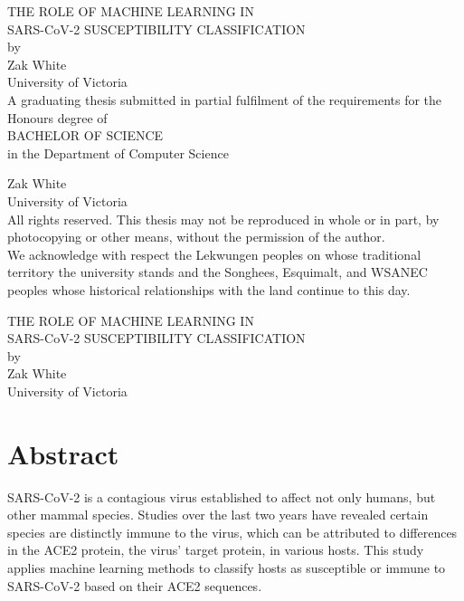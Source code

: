 \vspace*{8em}
\newcommand\tpbreak{\\[\baselineskip]}
\thispagestyle{empty}

\begin{center}
    THE ROLE OF MACHINE LEARNING IN\\ SARS-CoV-2 SUSCEPTIBILITY CLASSIFICATION
 \tpbreak
    by \tpbreak
    Zak White \\
    University of Victoria \tpbreak
    A graduating thesis submitted in partial fulfilment of the requirements for the Honours degree of \tpbreak
    BACHELOR OF SCIENCE \tpbreak
    in the Department of Computer Science
    
    \vfill
    
    \textcopyright\xspace 2022 Zak White \\
    University of Victoria \tpbreak    
    All rights reserved. This thesis may not be reproduced in whole or in part, by photocopying or other means, without the permission of the author. \tpbreak
    We acknowledge with respect the Lekwungen peoples on whose traditional territory the university stands and the Songhees, Esquimalt, and WSANEC peoples whose historical relationships with the land continue to this day.
\end{center}


\newpage

\vspace*{8em}
\begin{center}
    THE ROLE OF MACHINE LEARNING IN\\ SARS-CoV-2 SUSCEPTIBILITY CLASSIFICATION \tpbreak
    by \tpbreak
    Zak White \\
    University of Victoria
\end{center}


\section*{Abstract}

SARS-CoV-2 is a contagious virus established to affect not only humans, but other mammal species. Studies over the last two years have revealed certain species are distinctly immune to the virus, which can be attributed to differences in the ACE2 protein, the virus' target protein, in various hosts. This study applies machine learning methods to classify hosts as susceptible or immune to SARS-CoV-2 based on their ACE2 sequences.

